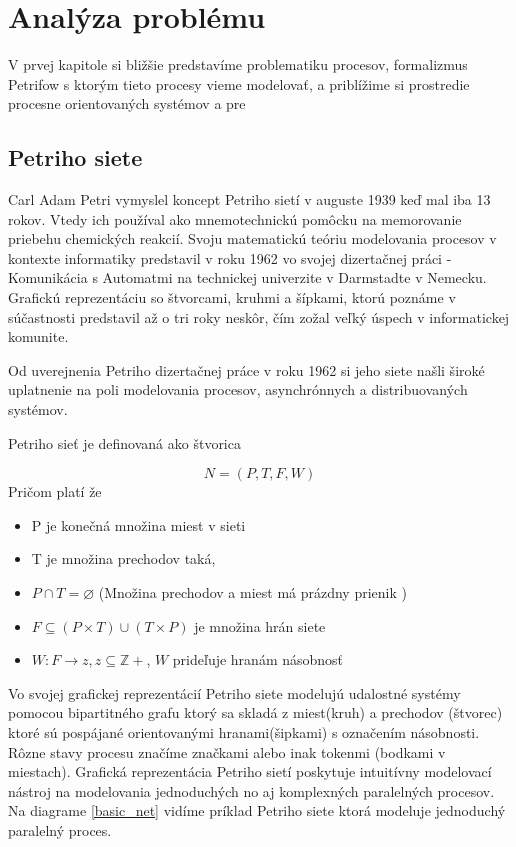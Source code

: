 
\section{Analýza problému}
V prvej kapitole si bližšie predstavíme problematiku procesov, formalizmus Petrifow s ktorým tieto procesy vieme modelovať, a priblížime si prostredie procesne orientovaných systémov a pre

\subsection{Petriho siete}
Carl Adam Petri vymyslel koncept Petriho sietí v auguste 1939 keď mal iba 13 rokov. Vtedy ich používal ako mnemotechnickú pomôcku na memorovanie priebehu chemických reakcií. Svoju matematickú teóriu modelovania procesov v kontexte informatiky predstavil v roku 1962 vo svojej dizertačnej práci - Komunikácia s Automatmi na technickej univerzite v Darmstadte v Nemecku. Grafickú reprezentáciu so štvorcami, kruhmi a šípkami, ktorú poznáme v súčastnosti predstavil až o tri roky neskôr, čím zožal veľký úspech v informatickej komunite. \cite{petri50years} 

Od uverejnenia Petriho dizertačnej práce v roku 1962 si jeho siete našli široké uplatnenie na poli modelovania procesov, asynchrónnych a distribuovaných systémov. 

Petriho sieť je definovaná ako štvorica

\[N = (P, T, F, W )\]
Pričom platí že
\begin{itemize}
\item P je konečná množina miest v sieti
\item T je množina prechodov taká,
\item $P\cap T = \varnothing$ (Množina prechodov a miest má prázdny prienik ) 
\item $F \subseteq (P \times T)\cup(T \times P)$ je množina hrán siete
\item $W: F \rightarrow z, z \subseteq \mathbb Z+$, $W$ prideľuje hranám násobnosť 
\end{itemize}

Vo svojej grafickej reprezentácií Petriho siete modelujú udalostné systémy pomocou bipartitného grafu ktorý sa skladá z miest(kruh) a prechodov (štvorec) ktoré sú pospájané orientovanými hranami(šipkami) s označením násobnosti. Rôzne stavy procesu značíme značkami alebo inak tokenmi (bodkami v miestach).
Grafická reprezentácia Petriho sietí poskytuje intuitívny modelovací nástroj na modelovania jednoduchých no aj komplexných paralelných procesov. Na diagrame \ref{basic_net} vidíme príklad Petriho siete ktorá modeluje jednoduchý paralelný proces. 


